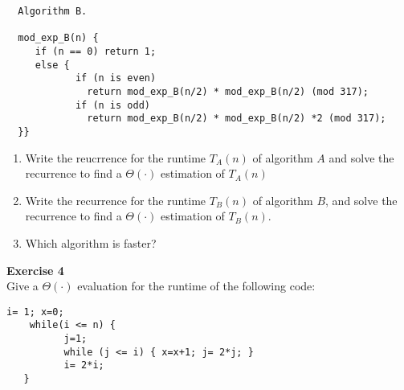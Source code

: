 \documentclass[11pt]{article}
\begin{document}
  \begin{verbatim}
  Algorithm B.
  
  mod_exp_B(n) {
     if (n == 0) return 1;
     else {
            if (n is even) 
              return mod_exp_B(n/2) * mod_exp_B(n/2) (mod 317);
            if (n is odd) 
              return mod_exp_B(n/2) * mod_exp_B(n/2) *2 (mod 317);
  }}
  \end{verbatim}
  \begin{enumerate}
    \item Write the reucrrence for the runtime \(T_{A}(n)\) of algorithm $A$ and solve the recurrence to find a \(\Theta(\cdot)\) estimation of \(T_{A}(n)\)
    \item Write the recurrence for the runtime \(T_B(n)\) of algorithm $B$, and solve the recurrence to find a \(\Theta(\cdot)\) estimation of \(T_B(n)\).
    \item Which algorithm is faster?
  \end{enumerate}
  \newpage
  \textbf{Exercise 4} \vspace{2mm} \\
  Give a \(\Theta(\cdot)\) evaluation for the runtime of the following code:
  \begin{lstlisting}[numbers=none, keywordstyle=\bfseries, frame=none, title={Assume that $n$ is a power two. Then $i$ from the outer loop takes successively the values: \(1, \: 2, \: 2^2, \: 2^3, \: \ldots, 2^{\log{n}}\)}]
    i= 1; x=0;
    while(i <= n) {
          j=1;
          while (j <= i) { x=x+1; j= 2*j; }
          i= 2*i;
   }       
  \end{lstlisting}
\end{document}

